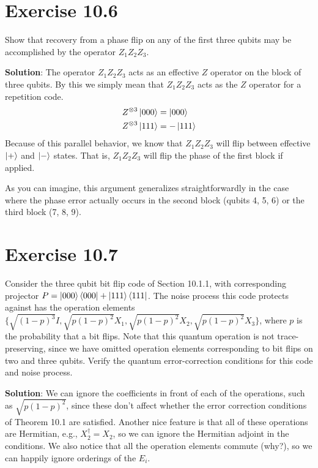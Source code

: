 \documentclass{book}
\begin{document}
\section*{Exercise 10.6}
    Show that recovery from a phase flip on any of the first three qubits may be accomplished by the operator $Z_1 Z_2 Z_3$.
    
    \textbf{Solution}: The operator $Z_1 Z_2 Z_3$ acts as an effective $Z$ operator on the block of three qubits. By this we simply mean that $Z_1 Z_2 Z_3$ acts as the $Z$ operator for a repetition code.
    \begin{align}
    \begin{aligned}
        Z^{\otimes{3}} \ket{000} &= \ket{000} \\
        Z^{\otimes{3}} \ket{111} &= - \ket{111}
    \end{aligned}
    \end{align}
    Because of this parallel behavior, we know that $Z_1 Z_2 Z_3$ will flip between effective $\ket{+}$ and $\ket{-}$ states. That is, $Z_1 Z_2 Z_3$ will flip the phase of the first block if applied.

    As you can imagine, this argument generalizes straightforwardly in the case where the phase error actually occurs in the second block (qubits 4, 5, 6) or the third block (7, 8, 9). 

\section*{Exercise 10.7}
    Consider the three qubit bit flip code of Section 10.1.1, with corresponding projector $P = \ket{000}\bra{000} + \ket{111}\bra{111}$. The noise process this code protects against has the operation elements \linebreak
    $\{\sqrt{(1-p)^3}I, \sqrt{p(1-p)^2} X_1, \sqrt{p(1-p)^2} X_2, \sqrt{p(1-p)^2} X_3\}$, where $p$ is the probability that a bit flips. Note that this quantum operation is not trace-preserving, since we have omitted operation elements corresponding to bit flips on two and three qubits. Verify the quantum error-correction conditions for this code and noise process.

    \textbf{Solution}: We can ignore the coefficients in front of each of the operations, such as $\sqrt{p(1-p)^2}$, since these don't affect whether the error correction conditions of Theorem 10.1 are satisfied. Another nice feature is that all of these operations are Hermitian, e.g., $X_2^\dagger = X_2$, so we can ignore the Hermitian adjoint in the conditions. We also notice that all the operation elements commute (why?), so we can happily ignore orderings of the $E_i$.
\end{document}
